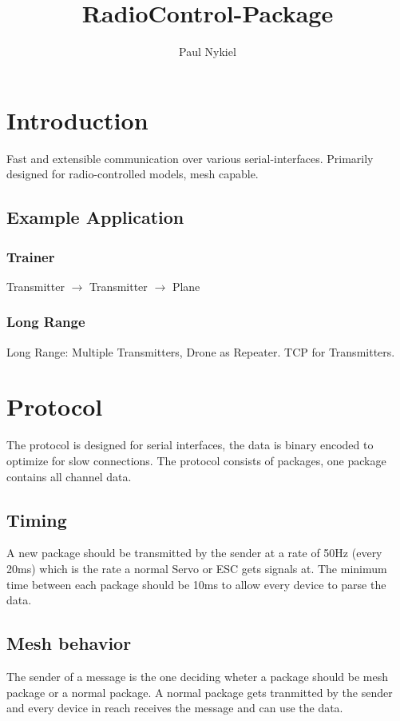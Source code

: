 \documentclass{report}
\title{RadioControl-Package}
\author{Paul Nykiel}
\begin{document}
\maketitle
\tableofcontents

\pagebreak

\chapter{Introduction}
  Fast and extensible communication over various serial-interfaces. Primarily
  designed for radio-controlled models, mesh capable.

\section{Example Application}
\subsection{Trainer}
Transmitter $\to$ Transmitter $\to$ Plane
\subsection{Long Range}
  Long Range: Multiple Transmitters, Drone as Repeater. TCP for Transmitters.

\chapter{Protocol}
  The protocol is designed for serial interfaces, the data is binary encoded to
  optimize for slow connections. The protocol consists of packages, one package
  contains all channel data.

  \section{Timing}
    A new package should be transmitted by the sender at a rate of 50Hz (every
    20ms) which is the rate a normal Servo or ESC gets signals at. The minimum
    time between each package should be 10ms to allow every device to parse the
    data.

  \section{Mesh behavior}
    The sender of a message is the one deciding wheter a package should be mesh
    package or a normal package. A normal package gets tranmitted by the sender
    and every device in reach receives the message and can use the data.
\end{document}
